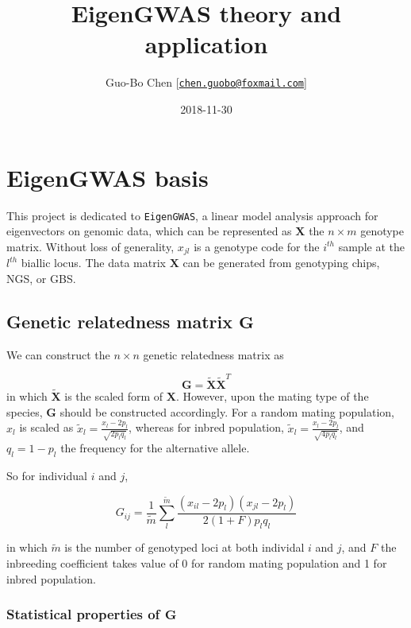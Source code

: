 \documentclass[]{book}
\title{EigenGWAS theory and application}
\author{Guo-Bo Chen
{[}\href{mailto:chen.guobo@foxmail.com}{\nolinkurl{chen.guobo@foxmail.com}}{]}}
\date{2018-11-30}
\begin{document}
\maketitle

{
\setcounter{tocdepth}{1}
\tableofcontents
}
\hypertarget{ch:basis}{%
\chapter{EigenGWAS basis}\label{ch:basis}}

This project is dedicated to \texttt{EigenGWAS}, a linear model analysis
approach for eigenvectors on genomic data, which can be represented as
\(\mathbf{X}\) the \(n \times m\) genotype matrix. Without loss of
generality, \(x_{jl}\) is a genotype code for the \(i^{th}\) sample at
the \(l^{th}\) biallic locus. The data matrix \(\mathbf{X}\) can be
generated from genotyping chips, NGS, or GBS.

\hypertarget{genetic-relatedness-matrix-mathbfg}{%
\section{\texorpdfstring{Genetic relatedness matrix
\(\mathbf{G}\)}{Genetic relatedness matrix \textbackslash{}mathbf\{G\}}}\label{genetic-relatedness-matrix-mathbfg}}

We can construct the \(n\times n\) genetic relatedness matrix as

\[\mathbf{G}=\tilde{\mathbf{X}}\tilde{\mathbf{X}}^T\] in which
\(\tilde{\mathbf{X}}\) is the scaled form of \(\mathbf{X}\). However,
upon the mating type of the species, \(\mathbf{G}\) should be
constructed accordingly. For a random mating population, \(x_l\) is
scaled as \(\tilde{x}_l=\frac{x_l-2p_l}{\sqrt{2p_lq_l}}\), whereas for
inbred population, \(\tilde{x}_l=\frac{x_l-2p_l}{\sqrt{4p_lq_l}}\), and
\(q_l=1-p_l\) the frequency for the alternative allele.

So for individual \(i\) and \(j\),

\begin{equation}
G_{ij}=\frac{1}{\tilde{m}}\sum_l^{\tilde{m}}\frac{(x_{il}-2p_l)(x_{jl}-2p_l)}{2(1+F)p_lq_l} \label{eq:G}
\end{equation}

in which \(\tilde{m}\) is the number of genotyped loci at both individal
\(i\) and \(j\), and \(F\) the inbreeding coefficient takes value of 0
for random mating population and 1 for inbred population.

\hypertarget{statistical-properties-of-mathbfg}{%
\subsection{\texorpdfstring{Statistical properties of
\(\mathbf{G}\)}{Statistical properties of \textbackslash{}mathbf\{G\}}}\label{statistical-properties-of-mathbfg}}
\end{document}
